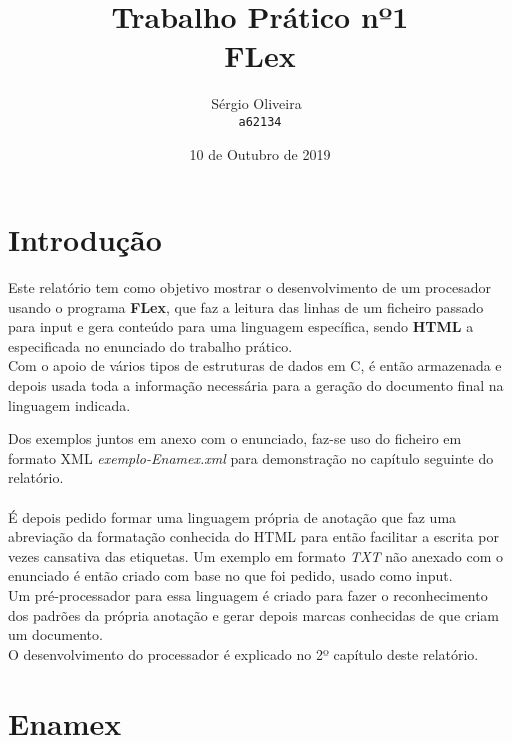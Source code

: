 \documentclass[11pt,a4paper]{report}
\begin{document}
\title{Trabalho Prático nº1 \\FLex}
\author{
   Sérgio Oliveira~\\
   \texttt{a62134}
   }
\date{10 de Outubro de 2019}
\maketitle
\raggedbottom
\pagebreak
\pagebreak


\tableofcontents
\pagebreak
\chapter{Introdução}


Este relatório tem como objetivo mostrar o desenvolvimento de um procesador usando o programa \textbf{FLex}, que faz a leitura das linhas de um ficheiro passado para input e gera conteúdo para uma linguagem específica, sendo \textbf{HTML} a especificada no enunciado do trabalho prático. 
\\


Com o apoio de vários tipos de estruturas de dados em C, é então armazenada e depois usada toda a informação necessária para a geração do documento final na linguagem indicada.


Dos exemplos juntos em anexo com o enunciado, faz-se uso do ficheiro em formato XML \textit{exemplo-Enamex.xml} para demonstração no capítulo seguinte do relatório.
\\
\\


É depois pedido formar uma linguagem própria de anotação que faz uma abreviação da formatação conhecida do HTML para então facilitar a escrita por vezes cansativa das etiquetas. Um exemplo em formato \textit{TXT} não anexado com o enunciado é então criado com base no que foi pedido, usado como input.
\\

Um pré-processador para essa linguagem é criado para fazer o reconhecimento dos padrões da própria anotação e gerar depois marcas conhecidas de que criam um documento. 
\\

O desenvolvimento do processador é explicado no 2º capítulo deste relatório.

\raggedbottom
\pagebreak


\chapter{Enamex}
\end{document}
